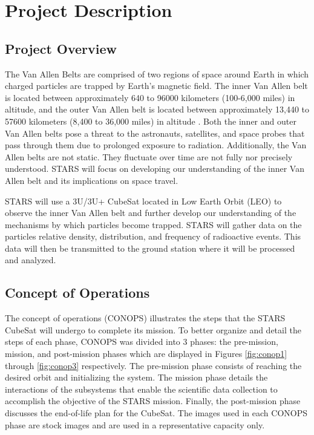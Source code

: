 
\section{Project Description}
\subsection{Project Overview}

The Van Allen Belts are comprised of two regions of space around Earth in which charged particles are trapped by Earth's magnetic field. The inner Van Allen belt is located between approximately 640 to 96000 kilometers (100-6,000 miles) in altitude, and the outer Van Allen belt is located between approximately 13,440 to 57600 kilometers (8,400 to 36,000 miles) in altitude \cite{VanAllen_1}. Both the inner and outer Van Allen belts pose a threat to the astronauts, satellites, and space probes that pass through them due to prolonged exposure to radiation. Additionally, the Van Allen belts are not static. They fluctuate over time are not fully nor precisely understood. STARS will focus on developing our understanding of the inner Van Allen belt and its implications on space travel.

STARS will use a 3U/3U+ CubeSat located in Low Earth Orbit (LEO) to observe the inner Van Allen belt and further develop our understanding of the mechanisms by which particles become trapped. STARS will gather data on the particles relative density, distribution, and frequency of radioactive events. This data will then be transmitted to the ground station where it will be processed and analyzed.

\subsection{Concept of Operations}
The concept of operations (CONOPS) illustrates the steps that the STARS CubeSat will undergo to complete its mission. To better organize and detail the steps of each phase, CONOPS was divided into 3 phases: the pre-mission, mission, and post-mission phases which are displayed in Figures \ref{fig:conop1} through \ref{fig:conop3} respectively. The pre-mission phase consists of reaching the desired orbit and initializing the system.  The mission phase details the interactions of the subsystems that enable the scientific data collection to accomplish the objective of the STARS mission. Finally, the post-mission phase discusses the end-of-life plan for the CubeSat. The images used in each CONOPS phase are stock images and are used in a representative capacity only.  

